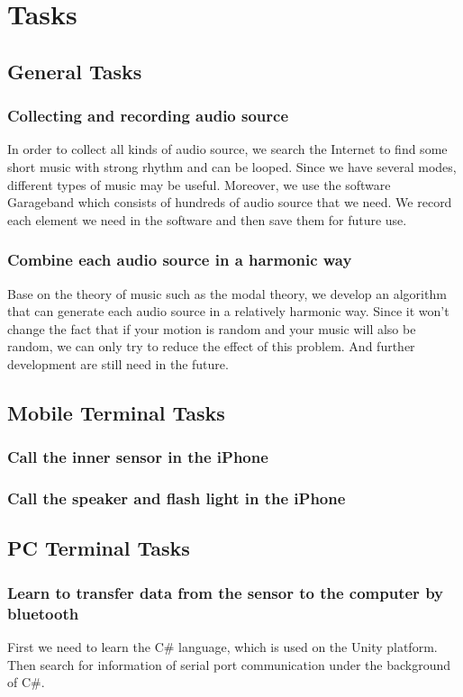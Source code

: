 \section{Tasks}

\subsection{General Tasks}

\subsubsection{Collecting and recording audio source}

In order to collect all kinds of audio source, we search the Internet to find
some short music with strong rhythm and can be looped. Since we have several
modes, different types of music may be useful. Moreover, we use the software
Garageband which consists of hundreds of audio source that we need. We record
each element we need in the software and then save them for future use. 

\subsubsection{Combine each audio source in a harmonic way}

Base on the theory of music such as the modal theory, we develop an algorithm
that can generate each audio source in a relatively harmonic way. Since it won’t
change the fact that if your motion is random and your music will also be
random, we can only try to reduce the effect of this problem. And further
development are still need in the future.  

\subsection{Mobile Terminal Tasks}

\subsubsection{Call the inner sensor in the iPhone}

\subsubsection{Call the speaker and flash light in the iPhone}

\subsection{PC Terminal Tasks}

\subsubsection{Learn to transfer data from the sensor to the computer by
  bluetooth} 

First we need to learn the C\# language, which is used on the Unity platform.
Then search for information of serial port communication under the background of
C\#. 

